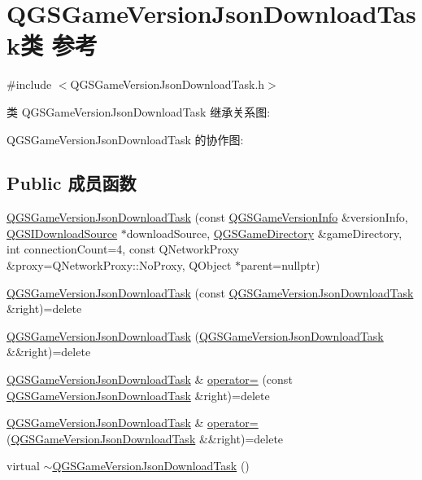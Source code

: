 \hypertarget{class_q_g_s_game_version_json_download_task}{}\section{Q\+G\+S\+Game\+Version\+Json\+Download\+Task类 参考}
\label{class_q_g_s_game_version_json_download_task}


{\ttfamily \#include $<$Q\+G\+S\+Game\+Version\+Json\+Download\+Task.\+h$>$}



类 Q\+G\+S\+Game\+Version\+Json\+Download\+Task 继承关系图\+:


Q\+G\+S\+Game\+Version\+Json\+Download\+Task 的协作图\+:
\subsection*{Public 成员函数}
\begin{DoxyCompactItemize}
\item 
\mbox{\hyperlink{class_q_g_s_game_version_json_download_task_a4137517ec7593cf550b09422fc0efdc6}{Q\+G\+S\+Game\+Version\+Json\+Download\+Task}} (const \mbox{\hyperlink{class_q_g_s_game_version_info}{Q\+G\+S\+Game\+Version\+Info}} \&version\+Info, \mbox{\hyperlink{class_q_g_s_i_download_source}{Q\+G\+S\+I\+Download\+Source}} $\ast$download\+Source, \mbox{\hyperlink{class_q_g_s_game_directory}{Q\+G\+S\+Game\+Directory}} \&game\+Directory, int connection\+Count=4, const Q\+Network\+Proxy \&proxy=Q\+Network\+Proxy\+::\+No\+Proxy, Q\+Object $\ast$parent=nullptr)
\item 
\mbox{\hyperlink{class_q_g_s_game_version_json_download_task_a6171a7fb8c8316cec2a537945a05943e}{Q\+G\+S\+Game\+Version\+Json\+Download\+Task}} (const \mbox{\hyperlink{class_q_g_s_game_version_json_download_task}{Q\+G\+S\+Game\+Version\+Json\+Download\+Task}} \&right)=delete
\item 
\mbox{\hyperlink{class_q_g_s_game_version_json_download_task_a0eb611b6b6fd44b037fa55b5f3e29d76}{Q\+G\+S\+Game\+Version\+Json\+Download\+Task}} (\mbox{\hyperlink{class_q_g_s_game_version_json_download_task}{Q\+G\+S\+Game\+Version\+Json\+Download\+Task}} \&\&right)=delete
\item 
\mbox{\hyperlink{class_q_g_s_game_version_json_download_task}{Q\+G\+S\+Game\+Version\+Json\+Download\+Task}} \& \mbox{\hyperlink{class_q_g_s_game_version_json_download_task_a48a52c47dd31a9b1e9b957851e65cafb}{operator=}} (const \mbox{\hyperlink{class_q_g_s_game_version_json_download_task}{Q\+G\+S\+Game\+Version\+Json\+Download\+Task}} \&right)=delete
\item 
\mbox{\hyperlink{class_q_g_s_game_version_json_download_task}{Q\+G\+S\+Game\+Version\+Json\+Download\+Task}} \& \mbox{\hyperlink{class_q_g_s_game_version_json_download_task_a8a4f5487863f78725a4deaa78b5d1f86}{operator=}} (\mbox{\hyperlink{class_q_g_s_game_version_json_download_task}{Q\+G\+S\+Game\+Version\+Json\+Download\+Task}} \&\&right)=delete
\item 
virtual \mbox{\hyperlink{class_q_g_s_game_version_json_download_task_a215ddfd20dbef1c1869c5bf237310569}{$\sim$\+Q\+G\+S\+Game\+Version\+Json\+Download\+Task}} ()
\end{DoxyCompactItemize}
